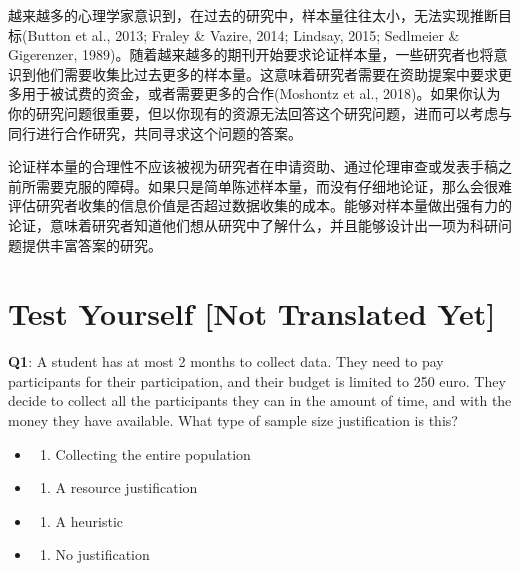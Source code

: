 \documentclass[
  letterpaper,
  DIV=11,
  numbers=noendperiod]{scrreprt}
\providecommand{\tightlist}{%
  \setlength{\itemsep}{0pt}\setlength{\parskip}{0pt}}\usepackage{longtable,booktabs,array}
\begin{document}
越来越多的心理学家意识到，在过去的研究中，样本量往往太小，无法实现推断目标(Button
et al., 2013; Fraley \& Vazire, 2014; Lindsay, 2015; Sedlmeier \&
Gigerenzer,
1989)。随着越来越多的期刊开始要求论证样本量，一些研究者也将意识到他们需要收集比过去更多的样本量。这意味着研究者需要在资助提案中要求更多用于被试费的资金，或者需要更多的合作(Moshontz
et al.,
2018)。如果你认为你的研究问题很重要，但以你现有的资源无法回答这个研究问题，进而可以考虑与同行进行合作研究，共同寻求这个问题的答案。

论证样本量的合理性不应该被视为研究者在申请资助、通过伦理审查或发表手稿之前所需要克服的障碍。如果只是简单陈述样本量，而没有仔细地论证，那么会很难评估研究者收集的信息价值是否超过数据收集的成本。能够对样本量做出强有力的论证，意味着研究者知道他们想从研究中了解什么，并且能够设计出一项为科研问题提供丰富答案的研究。

\hypertarget{test-yourself-not-translated-yet}{%
\section{Test Yourself {[}Not Translated
Yet{]}}\label{test-yourself-not-translated-yet}}

\textbf{Q1}: A student has at most 2 months to collect data. They need
to pay participants for their participation, and their budget is limited
to 250 euro. They decide to collect all the participants they can in the
amount of time, and with the money they have available. What type of
sample size justification is this?

\begin{itemize}
\item
  \begin{enumerate}
  \def\labelenumi{(\Alph{enumi})}
  \tightlist
  \item
    Collecting the entire population\\
  \end{enumerate}
\item
  \begin{enumerate}
  \def\labelenumi{(\Alph{enumi})}
  \setcounter{enumi}{1}
  \tightlist
  \item
    A resource justification\\
  \end{enumerate}
\item
  \begin{enumerate}
  \def\labelenumi{(\Alph{enumi})}
  \setcounter{enumi}{2}
  \tightlist
  \item
    A heuristic\\
  \end{enumerate}
\item
  \begin{enumerate}
  \def\labelenumi{(\Alph{enumi})}
  \setcounter{enumi}{3}
  \tightlist
  \item
    No justification\\
  \end{enumerate}
\end{itemize}
\end{document}
